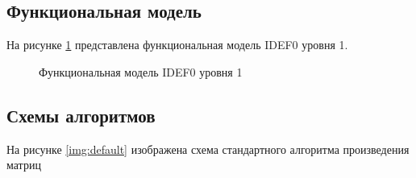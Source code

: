 \documentclass[a4paper,12pt]{article}
\begin{document}
\subsection{Функциональная модель}

На рисунке \ref{img:idef0} представлена функциональная модель IDEF0 уровня 1.

\begin{figure}[H]
    \caption{Функциональная модель IDEF0 уровня 1}
    \label{img:idef0}
\end{figure}

\subsection{Схемы алгоритмов}

На рисунке \ref{img:default} изображена схема стандартного алгоритма произведения
матриц
\end{document}
